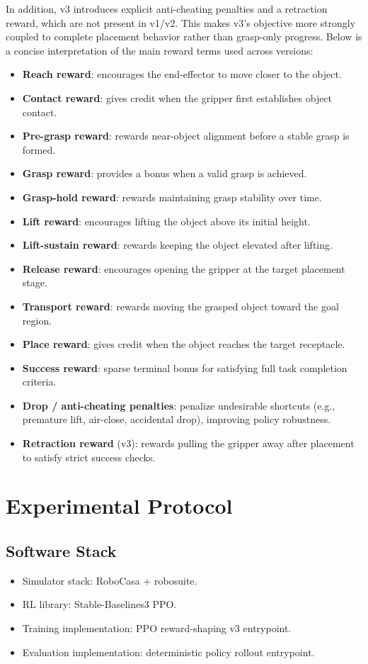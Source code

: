 \documentclass[11pt,a4paper]{article}
\begin{document}
In addition, v3 introduces explicit anti-cheating penalties and a retraction reward, which are not present in v1/v2. This makes v3's objective more strongly coupled to complete placement behavior rather than grasp-only progress. Below is a concise interpretation of the main reward terms used across versions:
\begin{itemize}
    \item \textbf{Reach reward}: encourages the end-effector to move closer to the object.
    \item \textbf{Contact reward}: gives credit when the gripper first establishes object contact.
    \item \textbf{Pre-grasp reward}: rewards near-object alignment before a stable grasp is formed.
    \item \textbf{Grasp reward}: provides a bonus when a valid grasp is achieved.
    \item \textbf{Grasp-hold reward}: rewards maintaining grasp stability over time.
    \item \textbf{Lift reward}: encourages lifting the object above its initial height.
    \item \textbf{Lift-sustain reward}: rewards keeping the object elevated after lifting.
    \item \textbf{Release reward}: encourages opening the gripper at the target placement stage.
    \item \textbf{Transport reward}: rewards moving the grasped object toward the goal region.
    \item \textbf{Place reward}: gives credit when the object reaches the target receptacle.
    \item \textbf{Success reward}: sparse terminal bonus for satisfying full task completion criteria.
    \item \textbf{Drop / anti-cheating penalties}: penalize undesirable shortcuts (e.g., premature lift, air-close, accidental drop), improving policy robustness.
    \item \textbf{Retraction reward} (v3): rewards pulling the gripper away after placement to satisfy strict success checks.
\end{itemize}

\section{Experimental Protocol}
\subsection{Software Stack}
\begin{itemize}
    \item Simulator stack: RoboCasa + robosuite.
    \item RL library: Stable-Baselines3 PPO.
    \item Training implementation: PPO reward-shaping v3 entrypoint.
    \item Evaluation implementation: deterministic policy rollout entrypoint.
\end{itemize}
\end{document}

